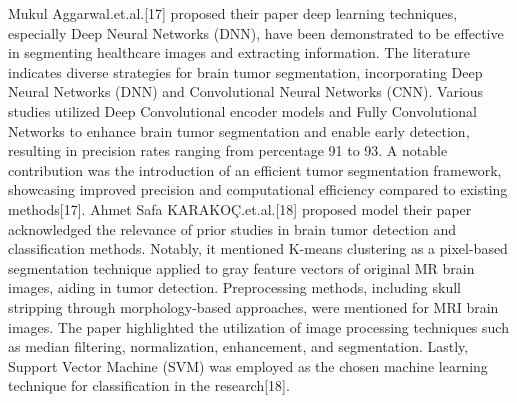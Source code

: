 \vspace{5mm} \newline
Mukul Aggarwal.et.al.[17] proposed their paper deep learning techniques, especially Deep Neural Networks (DNN), have been demonstrated to be effective in segmenting healthcare images and extracting information. The literature indicates diverse strategies for brain tumor segmentation, incorporating Deep Neural Networks (DNN) and Convolutional Neural Networks (CNN). Various studies utilized Deep Convolutional encoder models and Fully Convolutional Networks to enhance brain tumor segmentation and enable early detection, resulting in precision rates ranging from percentage 91  to 93. A notable contribution was the introduction of an efficient tumor segmentation framework, showcasing improved precision and computational efficiency compared to existing methods[17]. Ahmet Safa KARAKOÇ.et.al.[18] proposed model their paper acknowledged the relevance of prior studies in brain tumor detection and classification methods. Notably, it mentioned K-means clustering as a pixel-based segmentation technique applied to gray feature vectors of original MR brain images, aiding in tumor detection. Preprocessing methods, including skull stripping through morphology-based approaches, were mentioned for MRI brain images. The paper highlighted the utilization of image processing techniques such as median filtering, normalization, enhancement, and segmentation. Lastly, Support Vector Machine (SVM) was employed as the chosen machine learning technique for classification in the research[18].
